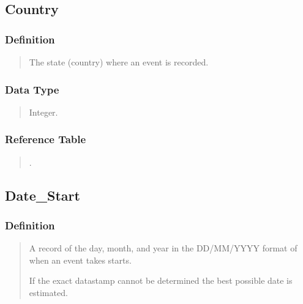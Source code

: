 \documentclass[letterpaper,10pt,english]{sphinxmanual}
\begin{document}
\subsection{Country}
\label{\detokenize{schema_tables:country}}

\subsubsection{Definition}
\label{\detokenize{schema_tables:id37}}\begin{quote}

\sphinxAtStartPar
The state (country) where an event is recorded.
\end{quote}


\subsubsection{Data Type}
\label{\detokenize{schema_tables:id38}}\begin{quote}

\sphinxAtStartPar
Integer.
\end{quote}


\subsubsection{Reference Table}
\label{\detokenize{schema_tables:id39}}\begin{quote}

\sphinxAtStartPar
{\hyperref[\detokenize{schema_tables:overview-table}]{}}.
\end{quote}


\subsection{Date\_Start}
\label{\detokenize{schema_tables:date-start}}

\subsubsection{Definition}
\label{\detokenize{schema_tables:id40}}\begin{quote}

\sphinxAtStartPar
A record of the day, month, and year in the DD/MM/YYYY format of when an event takes starts.

\sphinxAtStartPar
If the exact datastamp cannot be determined the best possible date is estimated.
\end{quote}
\end{document}
